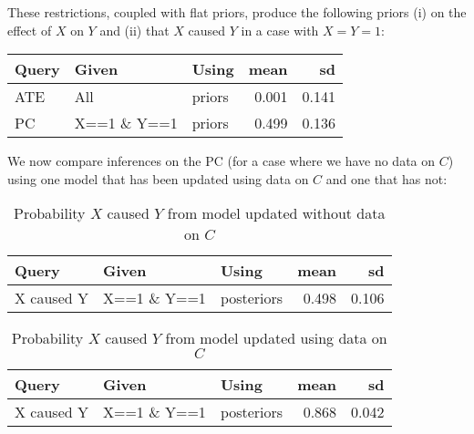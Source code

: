 \documentclass[
  12pt,
]{book}
\newenvironment{Shaded}{\begin{snugshade}}{\end{snugshade}}
\newcommand{\DataTypeTok}[1]{\textcolor[rgb]{0.13,0.29,0.53}{#1}}
\newcommand{\KeywordTok}[1]{\textcolor[rgb]{0.13,0.29,0.53}{\textbf{#1}}}
\newcommand{\NormalTok}[1]{#1}
\newcommand{\OperatorTok}[1]{\textcolor[rgb]{0.81,0.36,0.00}{\textbf{#1}}}
\newcommand{\StringTok}[1]{\textcolor[rgb]{0.31,0.60,0.02}{#1}}
\begin{document}
These restrictions, coupled with flat priors, produce the following priors (i) on the effect of \(X\) on \(Y\) and (ii) that \(X\) caused \(Y\) in a case with \(X=Y=1\):

\begin{tabular}{l|l|l|r|r}
\hline
Query & Given & Using & mean & sd\\
\hline
ATE & All & priors & 0.001 & 0.141\\
\hline
PC & X==1 \& Y==1 & priors & 0.499 & 0.136\\
\hline
\end{tabular}

We now compare inferences on the PC (for a case where we have no data on \(C\)) using one model that has been updated using data on \(C\) and one that has not:

\begin{Shaded}
\end{Shaded}

\begin{table}

\caption{\label{tab:unnamed-chunk-80}Probability $X$ caused $Y$ from model updated without data on $C$}
\centering
\begin{tabular}[t]{l|l|l|r|r}
\hline
Query & Given & Using & mean & sd\\
\hline
X caused Y & X==1 \& Y==1 & posteriors & 0.498 & 0.106\\
\hline
\end{tabular}
\end{table}

\begin{table}

\caption{\label{tab:unnamed-chunk-81}Probability $X$ caused $Y$ from model updated using data on $C$}
\centering
\begin{tabular}[t]{l|l|l|r|r}
\hline
Query & Given & Using & mean & sd\\
\hline
X caused Y & X==1 \& Y==1 & posteriors & 0.868 & 0.042\\
\hline
\end{tabular}
\end{table}
\end{document}
